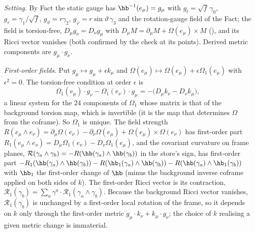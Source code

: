 \emph{Setting.} By Fact  the static gauge has $\hb^{-1}(e_{\mu}) = g_{\mu}$ with $g_{t} = \sqrt f\,\gamma_{0}$, $g_{r} = \gamma_{1}/\sqrt f$, $g_{\vartheta} = r\gamma_{2}$, $g_{\varphi} = r\sin\vartheta\,\gamma_{3}$ and the rotation-gauge field of the Fact; the field is torsion-free, $D_{\mu}g_{\nu} = D_{\nu}g_{\mu}$ with $D_{\mu}M = \partial_{\mu}M + \Omega(e_{\mu}) \times M$ (), and its Ricci vector vanishes (both confirmed by the check at its points). Derived metric components are $g_{\mu} \cdot g_{\nu}$.

\emph{First-order fields.} Put $g_{\mu} \mapsto g_{\mu} + \epsilon k_{\mu}$ and $\Omega(e_{\mu}) \mapsto \Omega(e_{\mu}) + \epsilon\Omega_{1}(e_{\mu})$ with $\epsilon^{2} = 0$. The torsion-free condition at order $\epsilon$ is
\[
\Omega_{1}(e_{\mu}) \cdot g_{\nu} - \Omega_{1}(e_{\nu}) \cdot g_{\mu} = -\bigl(D_{\mu}k_{\nu} - D_{\nu}k_{\mu}\bigr),
\]
a linear system for the $24$ components of $\Omega_{1}$ whose matrix is that of the background torsion map, which is invertible (it is the map that determines $\Omega$ from the coframe). So $\Omega_{1}$ is unique. The field strength $R(e_{\mu} \wedge e_{\nu}) = \partial_{\mu}\Omega(e_{\nu}) - \partial_{\nu}\Omega(e_{\mu}) + \Omega(e_{\mu}) \times \Omega(e_{\nu})$ has first-order part $R_{1}(e_{\mu} \wedge e_{\nu}) = D_{\mu}\Omega_{1}(e_{\nu}) - D_{\nu}\Omega_{1}(e_{\mu})$, and the covariant curvature on frame planes, $\mathcal{R}(\gamma_{a} \wedge \gamma_{b}) = -R(\hb(\gamma_{a}) \wedge \hb(\gamma_{b}))$ in the store's sign, has first-order part $-R_{1}(\hb(\gamma_{a}) \wedge \hb(\gamma_{b})) - R(\hb_{1}(\gamma_{a}) \wedge \hb(\gamma_{b})) - R(\hb(\gamma_{a}) \wedge \hb_{1}(\gamma_{b}))$ with $\hb_{1}$ the first-order change of $\hb$ (minus the background inverse coframe applied on both sides of $k$). The first-order Ricci vector is its contraction, $\mathcal{R}_{1}(\gamma_{b}) = \sum_{a}\gamma^{a} \cdot \mathcal{R}_{1}(\gamma_{a} \wedge \gamma_{b})$. Because the background Ricci vector vanishes, $\mathcal{R}_{1}(\gamma_{b})$ is unchanged by a first-order local rotation of the frame, so it depends on $k$ only through the first-order metric $g_{\mu} \cdot k_{\nu} + k_{\mu} \cdot g_{\nu}$; the choice of $k$ realising a given metric change is immaterial.

